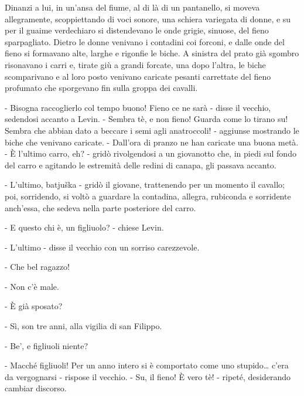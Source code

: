 Dinanzi a lui, in un'ansa del fiume, al di là di un pantanello, si moveva allegramente, scoppiettando di voci sonore, una schiera variegata di donne, e su per il guaime verdechiaro si distendevano le onde grigie, sinuose, del fieno sparpagliato. Dietro le donne venivano i contadini coi forconi, e dalle onde del fieno si formavano alte, larghe e rigonfie le biche. A sinistra del prato già sgombro risonavano i carri e, tirate giù a grandi forcate, una dopo l'altra, le biche scomparivano e al loro posto venivano caricate pesanti carrettate del fieno profumato che sporgevano fin sulla groppa dei cavalli. 

- Bisogna raccoglierlo col tempo buono! Fieno ce ne sarà - disse il vecchio, sedendosi accanto a Levin. - Sembra tè, e non fieno! Guarda come lo tirano su! Sembra che abbian dato a beccare i semi agli anatroccoli! - aggiunse mostrando le biche che venivano caricate. - Dall'ora di pranzo ne han caricate una buona metà. - È l'ultimo carro, eh? - gridò rivolgendosi a un giovanotto che, in piedi sul fondo del carro e agitando le estremità delle redini di canapa, gli passava accanto. 

- L'ultimo, batjuška - gridò il giovane, trattenendo per un momento il cavallo; poi, sorridendo, si voltò a guardare la contadina, allegra, rubiconda e sorridente anch'essa, che sedeva nella parte posteriore del carro. 

- E questo chi è, un figliuolo? - chiese Levin. 

- L'ultimo - disse il vecchio con un sorriso carezzevole. 

- Che bel ragazzo! 

- Non c'è male. 

- È già sposato? 

- Sì, son tre anni, alla vigilia di san Filippo. 

- Be', e figliuoli niente? 

- Macché figliuoli! Per un anno intero si è comportato come uno stupido\ldots{} c'era da vergognarsi - rispose il vecchio. - Su, il fieno! È vero tè! - ripeté, desiderando cambiar discorso. 

